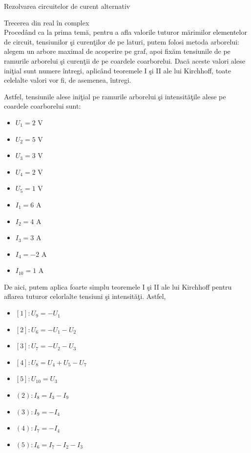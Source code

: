 \documentclass[a4paper]{article}
\begin{document}
\begin{section}{Rezolvarea circuitelor de curent alternativ}
\begin{subsection}{Trecerea din real \^ in complex\\}
	Proced\^ and ca la prima tem\u a, pentru a afla valorile tuturor m\u arimilor elementelor de circuit, tensiunilor \c si curen\c tilor de pe laturi, putem folosi metoda arborelui: alegem un arbore maximal de acoperire pe graf, apoi fix\u am tensiunile de pe ramurile arborelui \c si curen\c tii de pe coardele coarborelui. Dac\u a aceste valori alese ini\c tial sunt numere \^ intregi, aplic\^ and teoremele I \c si II ale lui Kirchhoff, toate celelalte valori vor fi, de asemenea, \^ intregi. 

Astfel, tensiunile alese ini\c tial pe ramurile arborelui \c si intensit\u a\c tile alese pe coardele coarborelui sunt:

\begin{multicols}{2}
\begin{large}
	\begin{itemize}
		\item $ U_1 = 2 $ V
		\item $ U_2 = 5 $ V
		\item $ U_3 = 3 $ V
		\item $ U_4 = 2 $ V
		\item $ U_5 = 1 $ V

		\item $ I_1 = 6 $ A
		\item $ I_2 = 4 $ A
		\item $ I_3 = 3 $ A
		\item $ I_4 = -2 $ A
		\item $ I_{10} = 1 $ A

	\end{itemize} \par
\end{large}
\end{multicols}

De aici, putem aplica foarte simplu teoremele I \c si II ale lui Kirchhoff pentru aflarea tuturor celorlalte tensiuni \c si intensit\u a\c ti. Astfel, 

\begin{multicols}{2}
\begin{large}
	\begin{itemize}
		\item $ [1]: U_9 = -U_1 $
		\item $ [2]: U_6 = -U_1 - U_2 $
		\item $ [3]: U_7 = -U_2 - U_3 $
		\item $ [4]: U_8 = U_4 + U_5 - U_7 $
		\item $ [5]: U_{10} = U_3 $
		
		\item $ (2): I_8 = I_3 - I_9 $
		\item $ (3): I_9 = - I_4 $
		\item $ (4): I_7 = - I_4 $
		\item $ (5): I_6 = I_7 - I_2 - I_3 $
	\end{itemize} \par
\end{large}
\end{multicols}


\end{subsection}
\end{section}
\end{document}
